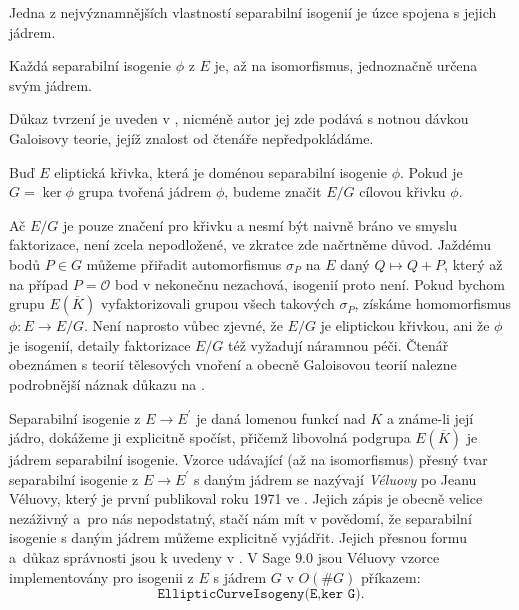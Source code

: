 \documentclass [12pt]{report}
\begin{document}
Jedna z nejvýznamnějších vlastností separabilní isogenií je úzce spojena s jejich  jádrem.


\begin{veta}\label{isomor}
Každá separabilní isogenie $\phi$ z $E$ je, až na isomorfismus, jednoznačně určena svým jádrem. 
\end{veta}
Důkaz tvrzení je uveden v \cite[Prop. 12.12]{Washington}, nicméně autor jej zde podává s notnou dávkou Galoisovy teorie, jejíž znalost od čtenáře nepředpokládáme.

\begin{znaceni}
Buď $E$ eliptická křivka, která je doménou separabilní isogenie $\phi$. Pokud je $G = \ker \phi$ grupa tvořená jádrem $\phi$, budeme značit $E/G$ cílovou křivku $\phi$. 
\end{znaceni}

\begin{poznamka}
Ač $E/G$ je pouze značení pro křivku a nesmí být naivně bráno ve smyslu faktorizace, není zcela nepodložené, ve zkratce zde načrtněme důvod. Jaždému bodů $P \in G$ můžeme přiřadit automorfismus $\sigma_P$ na $E$ daný $Q \mapsto Q+P$, který až na případ $P = \mathcal{O}$ bod v nekonečnu nezachová, isogenií proto není. Pokud bychom grupu $E(\overline{K})$ vyfaktorizovali grupou všech takových $\sigma_P$, získáme homomorfismus $\phi : E \longrightarrow E/G$. Není naprosto vůbec zjevné, že $E/G$ je eliptickou křivkou, ani že $\phi$ je isogenií, detaily faktorizace $E/G$ též vyžadují náramnou péči. Čtenář obeznámen s teorií tělesových vnoření a obecně Galoisovou teorií nalezne podrobnější náznak důkazu na \cite[Thm. 6.10.]{Sutherland}.
\end{poznamka}

Separabilní isogenie z $E \longrightarrow E^\prime$ je daná lomenou funkcí nad $K$ a známe-li její jádro, dokážeme ji explicitně spočíst, přičemž libovolná podgrupa $E(\overline{K})$ je jádrem separabilní isogenie. Vzorce udávající (až na isomorfismus) přesný tvar separabilní isogenie z $E \longrightarrow E^\prime$ s daným jádrem se nazývají \textit{Véluovy} po Jeanu Véluovy, který je první publikoval roku 1971 ve \cite{Velu}. Jejich zápis je obecně velice nezáživný a~pro nás nepodstatný, stačí nám mít v povědomí, že separabilní isogenie s daným jádrem můžeme explicitně vyjádřit. Jejich přesnou formu a~důkaz správnosti jsou k uvedeny v \cite[Ch.~8.2]{DeFeo}. V Sage $9.0$ jsou Véluovy vzorce implementovány pro isogenii z $E$ s jádrem $G$ v $O(\# G)$ příkazem:
\begin{equation*}
\texttt{EllipticCurveIsogeny(E,ker G)}.
\end{equation*}
\end{document}
